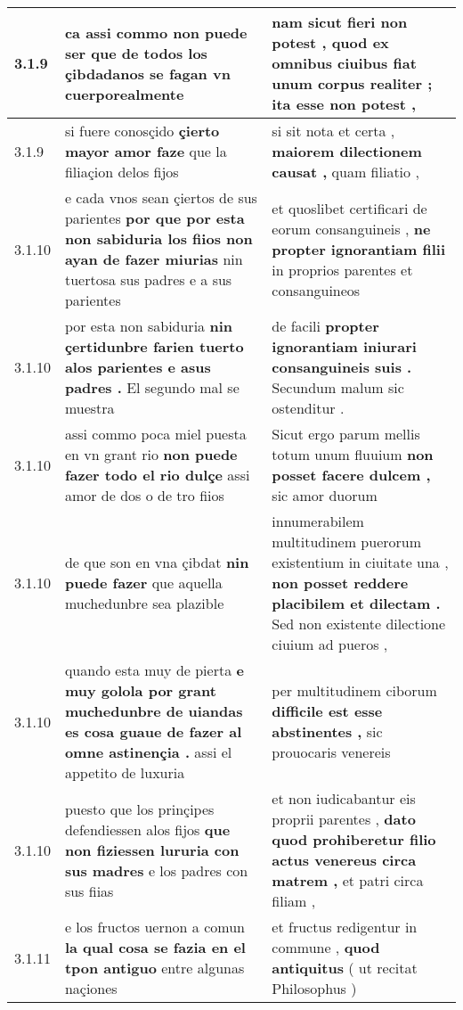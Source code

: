 \begin{tabular}{|p{1cm}|p{6.5cm}|p{6.5cm}|}
3.1.9 & ca assi commo non puede ser \textbf{ que de todos los çibdadanos se fagan vn } cuerporealmente & nam sicut fieri non potest , \textbf{ quod ex omnibus ciuibus fiat unum corpus realiter ; } ita esse non potest , \\\hline
3.1.9 & si fuere conosçido \textbf{ çierto mayor amor faze } que la filiaçion delos fijos & si sit nota et certa , \textbf{ maiorem dilectionem causat , } quam filiatio , \\\hline
3.1.10 & e cada vnos sean çiertos de sus parientes \textbf{ por que por esta non sabiduria los fiios non ayan de fazer miurias } nin tuertosa sus padres e a sus parientes & et quoslibet certificari de eorum consanguineis , \textbf{ ne propter ignorantiam filii } in proprios parentes et consanguineos \\\hline
3.1.10 & por esta non sabiduria \textbf{ nin çertidunbre farien tuerto alos parientes e asus padres . } El segundo mal se muestra & de facili \textbf{ propter ignorantiam iniurari consanguineis suis . } Secundum malum sic ostenditur . \\\hline
3.1.10 & assi commo poca miel puesta en vn grant rio \textbf{ non puede fazer todo el rio dulçe } assi amor de dos o de tro fiios & Sicut ergo parum mellis totum unum fluuium \textbf{ non posset facere dulcem , } sic amor duorum \\\hline
3.1.10 & de que son en vna çibdat \textbf{ nin puede fazer } que aquella muchedunbre sea plazible & innumerabilem multitudinem puerorum existentium in ciuitate una , \textbf{ non posset reddere placibilem et dilectam . } Sed non existente dilectione ciuium ad pueros , \\\hline
3.1.10 & quando esta muy de pierta \textbf{ e muy golola por grant muchedunbre de uiandas es cosa guaue de fazer al omne astinençia . } assi el appetito de luxuria & per multitudinem ciborum \textbf{ difficile est esse abstinentes , } sic prouocaris venereis \\\hline
3.1.10 & puesto que los prinçipes defendiessen alos fijos \textbf{ que non fiziessen lururia con sus madres } e los padres con sus fiias & et non iudicabantur eis proprii parentes , \textbf{ dato quod prohiberetur filio actus venereus circa matrem , } et patri circa filiam , \\\hline
3.1.11 & e los fructos uernon a comun \textbf{ la qual cosa se fazia en el tpon antiguo } entre algunas naçiones & et fructus redigentur in commune , \textbf{ quod antiquitus } ( ut recitat Philosophus ) \\\hline

\end{tabular}
